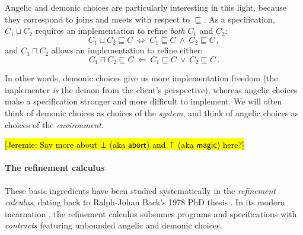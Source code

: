 \documentclass[sigplan,screen]{acmart}
\newcommand{\kw}[1]{\ensuremath{ \mathsf{#1} }}
\newcommand{\hlc}[2][yellow]{ {\sethlcolor{#1} \hl{#2}} }
\newcommand\jk[1]{\hlc[pink]{[Jeremie: #1]}}
\begin{document}
Angelic and demonic choices
are particularly interesting in this light,
because they correspond to joins and meets
with respect to $\sqsubseteq$.
As a specification, $C_1 \sqcup C_2$
requires an implementation to refine
\emph{both} $C_1$ and $C_2$:
\[
    C_1 \sqcup C_2 \sqsubseteq C \: \Leftrightarrow \:
    C_1 \sqsubseteq C \: \wedge \: C_2 \sqsubseteq C \,,
\]
and $C_1 \sqcap C_2$
allows an implementation to refine
either:
\[
    C_1 \sqcap C_2 \sqsubseteq C \: \Leftarrow \:
    C_1 \sqsubseteq C \: \vee \: C_2 \sqsubseteq C \,.
\]

In other words,
demonic choices %
give us more
implementation freedom
(the implementer \emph{is} the demon
from the client's perspective),
whereas angelic choices make a specification
stronger and more difficult to implement.
We will often think of demonic choices as
choices of the \emph{system}, %
and think of angelic choices as
choices of the \emph{environment}.

\jk{Say more about $\bot$ (aka $\kw{abort}$) and
$\top$ (aka $\kw{magic}$) here?}


\paragraph{The refinement calculus} %

These basic ingredients have been studied systematically
in the \emph{refinement calculus},
dating back to Ralph-Johan Back's 1978 PhD thesis \cite{backthesis}.
In its modern incarnation \cite{refcal},
the refinement calculus
subsumes programs and specifications with \emph{contracts}
featuring unbounded angelic and demonic choices.

\end{document}
